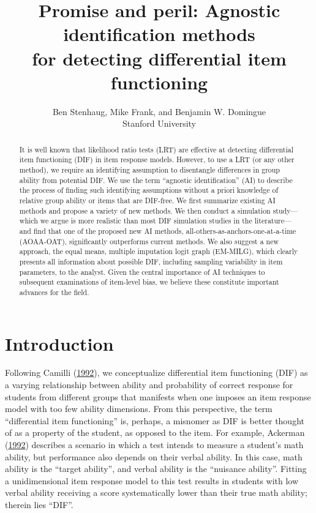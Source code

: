 \documentclass[
  11pt,
]{article}
\title{Promise and peril: Agnostic identification methods\\
for detecting differential item functioning}
\subtitle{Ben Stenhaug, Mike Frank, and Benjamin W. Domingue\\
Stanford University}
\author{}
\date{\vspace{-2.5em}}
\begin{document}
\maketitle
\begin{abstract}
It is well known that likelihood ratio tests (LRT) are effective at detecting differential item functioning (DIF) in item response models. However, to use a LRT (or any other method), we require an identifying assumption to disentangle differences in group ability from potential DIF. We use the term ``agnostic identification'' (AI) to describe the process of finding such identifying assumptions without a priori knowledge of relative group ability or items that are DIF-free. We first summarize existing AI methods and propose a variety of new methods. We then conduct a simulation study---which we argue is more realistic than most DIF simulation studies in the literature---and find that one of the proposed new AI methods, all-others-as-anchors-one-at-a-time (AOAA-OAT), significantly outperforms current methods. We also suggest a new approach, the equal means, multiple imputation logit graph (EM-MILG), which clearly presents all information about possible DIF, including sampling variability in item parameters, to the analyst. Given the central importance of AI techniques to subsequent examinations of item-level bias, we believe these constitute important advances for the field. \clearpage
\end{abstract}

{
\setcounter{tocdepth}{5}
\tableofcontents
}
\clearpage

\hypertarget{intro}{%
\section{Introduction}\label{intro}}

Following Camilli (\protect\hyperlink{ref-camilli1992conceptual}{1992}), we conceptualize differential item functioning (DIF) as a varying relationship between ability and probability of correct response for students from different groups that manifests when one imposes an item response model with too few ability dimensions. From this perspective, the term \enquote{differential item functioning} is, perhaps, a misnomer as DIF is better thought of as a property of the student, as opposed to the item. For example, Ackerman (\protect\hyperlink{ref-ackerman1992didactic}{1992}) describes a scenario in which a test intends to measure a student's math ability, but performance also depends on their verbal ability. In this case, math ability is the \enquote{target ability}, and verbal ability is the \enquote{nuisance ability}. Fitting a unidimensional item response model to this test results in students with low verbal ability receiving a score systematically lower than their true math ability; therein lies \enquote{DIF}.
\end{document}
